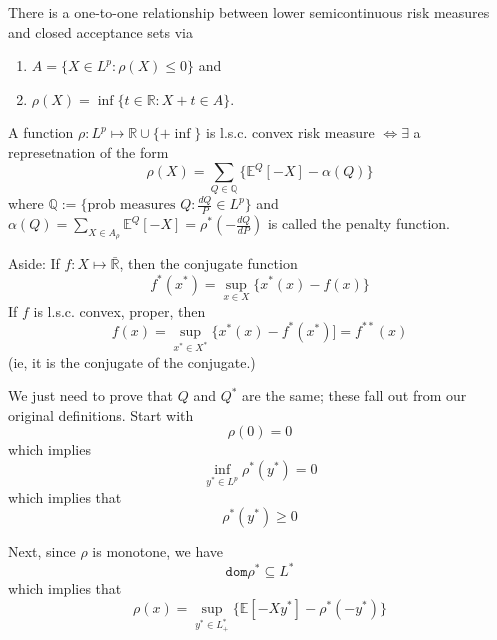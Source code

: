 \begin{lemma}\label{lem:rudloff_lemma3}
	There is a one-to-one relationship between lower semicontinuous risk measures and closed acceptance sets via
	\begin{enumerate}
		\item $A=\{ X \in L^p: \rho(X) \leq 0 \}$ and
		\item $\rho(X) = \inf \{ t\in\mathbb{R}: X + t \in A \}$.
	\end{enumerate}
\end{lemma}

\begin{theorem}\label{thm:rudloff_dual}
	A function $\rho: L^p \mapsto \mathbb{R}\cup \{+\inf\}$ is l.s.c. convex risk measure $\iff \exists$ a represetnation of the form
	\begin{equation}
		\rho(X) = \sum_{Q \in \mathbb{Q}} \{ \mathbb{E}^Q[-X] - \alpha(Q) \}
	\end{equation}
	where $\mathbb{Q}:=\{ \text{prob measures } Q : \frac{dQ}{P}\in L^p \}$ and $\alpha(Q) = \sum_{X \in A_\rho} \mathbb{E}^Q[-X] = \rho^*(-\frac{dQ}{dP})$ is called the penalty function.
	
	
\end{theorem}

Aside: If $f : X \mapsto \bar{\mathbb{R}}$, then the conjugate function
\begin{equation}
	f^* (x^* ) = \sup_{x\in X} \{ x^*(x) - f(x) \}
\end{equation}
If $f$ is l.s.c. convex, proper, then
\begin{equation}
	f(x) = \sup_{x^*\in X^*} \{ x^*(x) - f^*(x^*) ] = f^{**}(x)
\end{equation}
(ie, it is the conjugate of the conjugate.)

We just need to prove that $Q$ and $Q^*$ are the same; these fall out from our original definitions. Start with
\begin{equation}
	\rho(0)=0
\end{equation}
which implies
\begin{equation}
	\inf_{y^*\in L^p} \rho^*(y^*) = 0
\end{equation}
which implies that
\begin{equation}
	\rho^*(y^*) \geq 0
\end{equation}

Next, since $\rho$ is monotone, we have
\begin{equation}
	\texttt{dom} \rho^* \subseteq L^*
\end{equation}
which implies that
\begin{equation}
	\rho(x) = \sup_{y^* \in L^*_+} \{ \mathbb{E}[-Xy^*]  - \rho^*(-y^*) \}
\end{equation}

